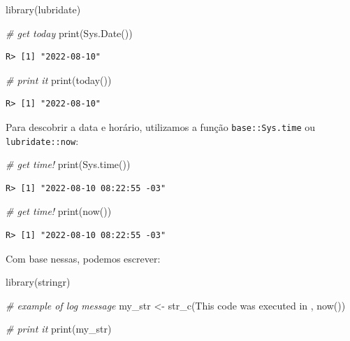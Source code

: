 \documentclass[
  11pt,
]{book}
\newenvironment{Shaded}{\begin{snugshade}}{\end{snugshade}}
\newcommand{\CommentTok}[1]{\textcolor[rgb]{0.37,0.37,0.37}{\textit{#1}}}
\newcommand{\FunctionTok}[1]{\textcolor[rgb]{0,0,0}{#1}}
\newcommand{\NormalTok}[1]{#1}
\newcommand{\OtherTok}[1]{\textcolor[rgb]{0.37,0.37,0.37}{#1}}
\newcommand{\StringTok}[1]{\textcolor[rgb]{0.5,0.5,0.5}{#1}}
\begin{document}
\begin{Shaded}
\begin{Highlighting}[]
\FunctionTok{library}\NormalTok{(lubridate)}

\CommentTok{\# get today}
\FunctionTok{print}\NormalTok{(}\FunctionTok{Sys.Date}\NormalTok{())}
\end{Highlighting}
\end{Shaded}

\begin{verbatim}
R> [1] "2022-08-10"
\end{verbatim}

\begin{Shaded}
\begin{Highlighting}[]
\CommentTok{\# print it}
\FunctionTok{print}\NormalTok{(}\FunctionTok{today}\NormalTok{())}
\end{Highlighting}
\end{Shaded}

\begin{verbatim}
R> [1] "2022-08-10"
\end{verbatim}

Para descobrir a data e horário, utilizamos a função \texttt{base::Sys.time} ou \texttt{lubridate::now}:  

\begin{Shaded}
\begin{Highlighting}[]
\CommentTok{\# get time!}
\FunctionTok{print}\NormalTok{(}\FunctionTok{Sys.time}\NormalTok{())}
\end{Highlighting}
\end{Shaded}

\begin{verbatim}
R> [1] "2022-08-10 08:22:55 -03"
\end{verbatim}

\begin{Shaded}
\begin{Highlighting}[]
\CommentTok{\# get time!}
\FunctionTok{print}\NormalTok{(}\FunctionTok{now}\NormalTok{())}
\end{Highlighting}
\end{Shaded}

\begin{verbatim}
R> [1] "2022-08-10 08:22:55 -03"
\end{verbatim}

Com base nessas, podemos escrever:

\begin{Shaded}
\begin{Highlighting}[]
\FunctionTok{library}\NormalTok{(stringr)}

\CommentTok{\# example of log message}
\NormalTok{my\_str }\OtherTok{\textless{}{-}} \FunctionTok{str\_c}\NormalTok{(}\StringTok{\textquotesingle{}This code was executed in \textquotesingle{}}\NormalTok{, }\FunctionTok{now}\NormalTok{())}

\CommentTok{\# print it}
\FunctionTok{print}\NormalTok{(my\_str)}
\end{Highlighting}
\end{Shaded}
\end{document}
